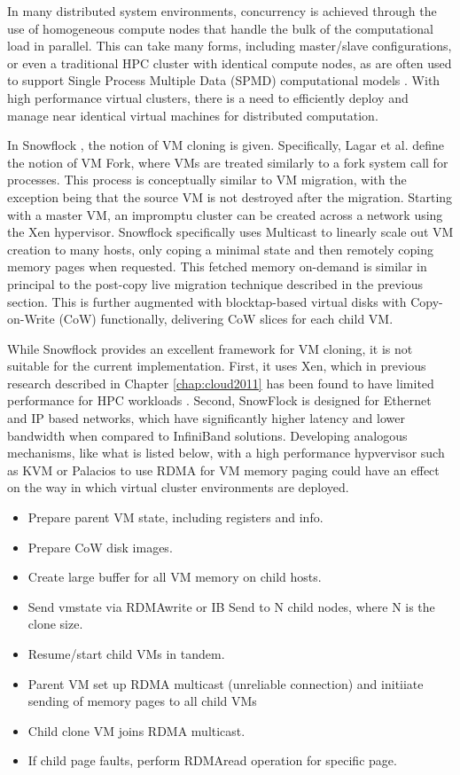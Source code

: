 In many distributed system environments, concurrency is achieved through the use of homogeneous compute nodes that handle the bulk of the computational load in parallel. This can take many forms, including master/slave configurations, or even a traditional HPC cluster with identical compute nodes, as are often used to support Single Process Multiple Data (SPMD) computational models \cite{spmd1988}. With high performance virtual clusters, there is a need to efficiently deploy and manage near identical virtual machines for distributed computation. 

In Snowflock \cite{lagar2009snowflock, lagar2011snowflock}, the notion of VM cloning is given. Specifically, Lagar et al. define the notion of VM Fork, where VMs are treated similarly to a fork\(\) system call for processes.   This process is conceptually similar to VM migration, with the exception being that the source VM is not destroyed after the migration. Starting with a master VM, an impromptu cluster can be created across a network using the Xen hypervisor.  Snowflock specifically uses Multicast to linearly scale out VM creation to many hosts, only coping a minimal state and then remotely coping memory pages when requested.  This fetched memory on-demand is similar in principal to the post-copy live migration technique described in the previous section.  This is further augmented with blocktap-based virtual disks with Copy-on-Write (CoW) functionally, delivering CoW slices for each child VM. 

While Snowflock provides an excellent framework for VM cloning, it is not suitable for the current implementation. First, it uses Xen, which in previous research described in Chapter \ref{chap:cloud2011} has been found to have limited performance for HPC workloads \cite{Younge2011cloud}.  Second, SnowFlock is designed for Ethernet and IP based networks, which have significantly higher latency and lower bandwidth when compared to InfiniBand solutions.  Developing analogous mechanisms, like what is listed below, with a high performance hypvervisor such as KVM or Palacios \cite{lange2010palacios} to use RDMA for VM memory paging could have an effect on the way in which virtual cluster environments are deployed. %

\begin{itemize}
\item Prepare parent VM state, including registers and info.
\item Prepare CoW disk images.
\item Create large buffer for all VM memory on child hosts. 
\item Send vmstate via RDMAwrite or IB Send to N child nodes, where N is the clone size.
\item Resume/start child VMs in tandem. 
\item Parent VM set up RDMA multicast (unreliable connection) and initiiate sending of memory pages to all child VMs 
\item Child clone VM joins RDMA multicast.
\item If child page faults, perform RDMAread operation for specific page. 
\end{itemize}

